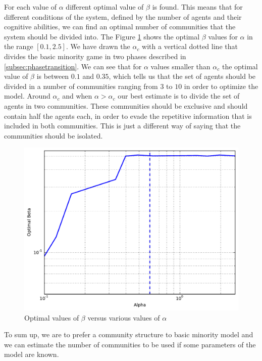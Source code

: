 For each value of $\alpha$ different optimal value of $\beta$ is found.
This means that for different conditions of the system, defined by the number of agents and their cognitive abilities, we can find an optimal number of communities that the system should be divided into.
The Figure \ref{fig:optimal beta} shows the optimal $\beta$ values for $\alpha$ in the range $[0.1,2.5]$.
We have drawn the $\alpha_c$ with a vertical dotted line that divides the basic minority game in two phases described in \ref{subsec:phasetransition}.
We can see that for $\alpha$ values smaller than $\alpha_c$ the optimal value of $\beta$ is between $0.1$ and $0.35$, which tells us that the set of agents should be divided in a number of communities ranging from $3$ to $10$ in order to optimize the model.
Around $\alpha_c$ and when $\alpha>\alpha_c$ our best estimate is to divide the set of agents in two communities.
These communities should be exclusive and should contain half the agents each, in order to evade the repetitive information that is included in both communities.
This is just a different way of  saying that the communities should be isolated.

\begin{figure}[h]
\centering
\includegraphics[scale=0.4]{images/algorithm/optimal_beta.pdf}
\caption{Optimal values of $\beta$ versus various values of $\alpha$}
\label{fig:optimal beta}
\end{figure}

To sum up, we are to prefer a community structure to basic minority model and we can estimate the number of communities to be used if some parameters of the model are known.

